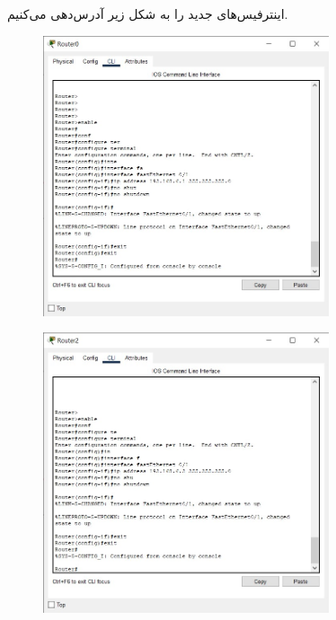 \documentclass{article}
\begin{document}
\subsection{}
اینترفیس‌های جدید را به شکل زیر آدرس‌دهی می‌کنیم.
\begin{figure}[H]
    \centering
    \includegraphics[width=0.75\textwidth]{figures/17.jpg}
    \caption{}
    \label{fig:fig1}
\end{figure}
\begin{figure}[H]
    \centering
    \includegraphics[width=0.75\textwidth]{figures/18.jpg}
    \caption{}
    \label{fig:fig1}
\end{figure}
\end{document}
